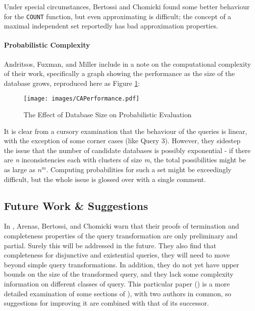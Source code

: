 Under special circumstances, Bertossi and Chomicki found some better behaviour for the \texttt{COUNT} function, but even approximating is difficult; the concept of a maximal independent set reportedly has bad approximation properties.

\paragraph{Probabilistic Complexity}
Andritsos, Fuxman, and Miller include in \cite{CA} a note on the computational complexity of their work, specifically a graph showing the performance as the size of the database grows, reproduced here as Figure \ref{CAPerformance}:

\begin{figure}[!h]
  \centering \texttt{[image: images/CAPerformance.pdf]}
  \caption[The Effect of Database Size on Probabilistic Evaluation]{The Effect of Database Size on Probabilistic Evaluation \cite{CA}}
  \label{CAPerformance}
\end{figure}

It is clear from a cursory examination that the behaviour of the queries is linear, with the exception of some corner cases (like Query 3). However, they sidestep the issue that the number of candidate databases is possibly exponential - if there are \textit{n} inconsistencies each with clusters of size \textit{m}, the total possibilities might be as large as $n^{m}$. Computing probabilities for such a set might be exceedingly difficult, but the whole issue is glossed over with a single comment.

\subsection*{Future Work \& Suggestions}

In \cite{CQI}, Arenas, Bertossi, and Chomicki warn that their proofs of termination and completeness properties of the query transformation are only preliminary and partial. Surely this will be addressed in the future. They also find that completeness for disjunctive and existential queries, they will need to move beyond simple query transformations. In addition, they do not yet have upper bounds on the size of the transformed query, and they lack some complexity information on different classes of query. This particular paper (\cite{CQI}) is a more detailed examination of some sections of \cite{CQ}), with two authors in common, so suggestions for improving it are combined with that of its successor.


